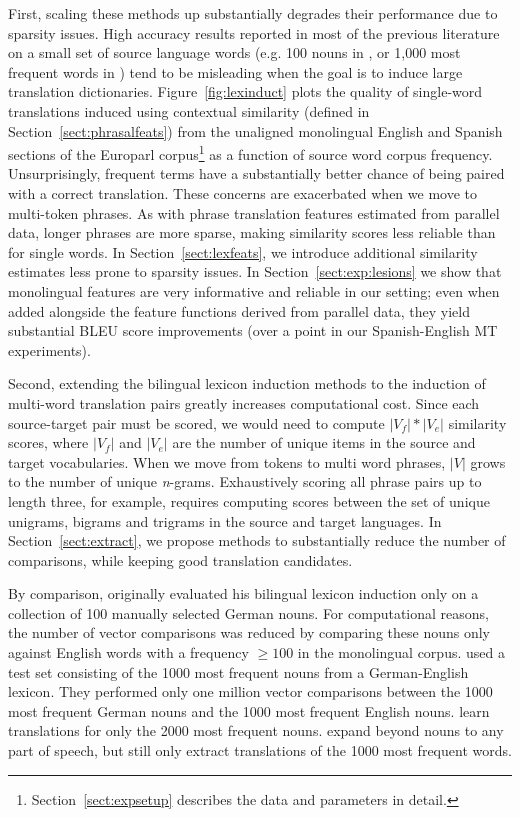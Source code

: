 \documentclass[11pt]{article}
\newcommand{\secref}[1]{Section~\ref{#1}}
\newcommand{\figref}[1]{Figure~\ref{#1}}
\begin{document}
First, scaling these methods up substantially degrades their performance due to sparsity issues. High accuracy results reported in most of the previous literature on a small set of source language words (e.g. 100 nouns in , or 1,000 most frequent words in ) tend to be misleading when the goal is to induce large translation dictionaries. \figref{fig:lexinduct} plots the quality of single-word translations induced using contextual similarity (defined in \secref{sect:phrasalfeats}) from the unaligned monolingual English and Spanish sections of the Europarl corpus\footnote{\secref{sect:expsetup} describes the data and parameters in detail.} as a function of source word corpus frequency. Unsurprisingly, frequent terms have a substantially better chance of being paired with a correct translation.  These concerns are exacerbated when we move to multi-token phrases.  As with phrase translation features estimated from parallel data, longer phrases are more sparse, making similarity scores less reliable than for single words.  In \secref{sect:lexfeats}, we introduce additional similarity estimates less prone to sparsity issues.  In \secref{sect:exp:lesions} we show that monolingual features are very informative and reliable in our setting; even when added alongside the feature functions derived from parallel data, they yield substantial BLEU score improvements (over a point in our Spanish-English MT experiments). %

Second, extending the bilingual lexicon induction methods to the induction of multi-word translation pairs greatly increases computational cost. Since each source-target pair must be scored, we would need to compute $|V_{f}| * |V_{e}|$ similarity scores, where $|V_{f}|$ and $|V_{e}|$ are the number of unique items in the source and target vocabularies. When we move from tokens to multi word phrases, $|V|$ grows to the number of unique {\it n}-grams. Exhaustively scoring all phrase pairs up to length three, for example, requires computing scores between the set of unique unigrams, bigrams and trigrams in the source and target languages.  In \secref{sect:extract}, we propose methods to substantially reduce the number of comparisons, while keeping good translation candidates.

By comparison,  originally evaluated his bilingual lexicon induction only on a collection of 100 manually selected German nouns.  For computational reasons, the number of vector comparisons was reduced by comparing these nouns only against English words with a frequency $\geq100$ in the monolingual corpus.
 used a test set consisting of the 1000 most frequent nouns from a German-English lexicon.  They performed only one million vector comparisons between the 1000 most frequent German nouns and the 1000 most frequent English nouns.
 learn translations for only the 2000 most frequent nouns.    expand beyond nouns to any part of speech, but still only extract translations of the 1000 most frequent words.
\end{document}
